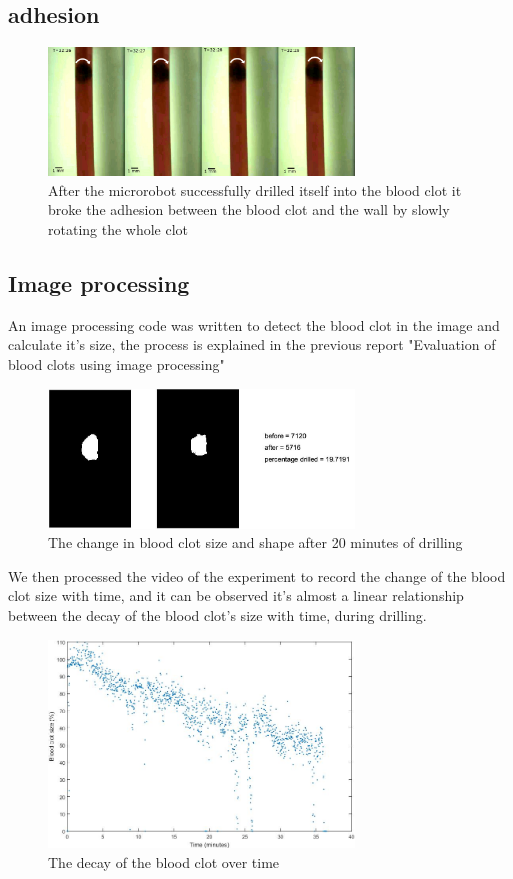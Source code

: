 \documentclass{MNR}
\begin{document}
\subsection*{adhesion}


\begin{figure}[h]
\centering
\includegraphics[width=3.2in]{rotclotedit}
\caption{After the microrobot successfully drilled itself into the blood clot it broke the adhesion between the blood clot and the wall by slowly rotating the whole clot }\label{fig01:System}
\end{figure}

\subsection*{Image processing}
An image processing code was written to detect the blood clot in the image and calculate it's size, the process is explained in the previous report "Evaluation of blood clots using image processing"
\begin{figure}[h]
\centering
\includegraphics[width=3.2in]{myfig}
\caption{The change in blood clot size and shape after 20 minutes of drilling }\label{fig01:System}
\end{figure}
We then processed the video of the experiment to record the change of the blood clot size with time, and it can be observed it's almost a linear relationship between the decay of the blood clot's size with time, during drilling.
\begin{figure}[h]
\centering
\includegraphics[width=3.2in]{graph3}
\caption{The decay of the blood clot over time }\label{fig01:System}
\end{figure}
\end{document}
